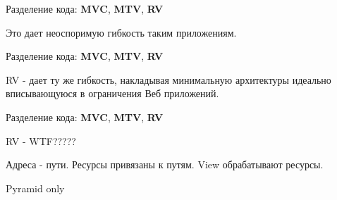 \begin{frame}{Разделение кода: \textbf{MVC}, \textbf{MTV}, \textbf{RV}}

  Это дает неоспоримую гибкость таким приложениям.

\end{frame}


\begin{frame}{Разделение кода: \textbf{MVC}, \textbf{MTV}, \textbf{RV}}

  RV - дает ту же гибкость, накладывая минимальную архитектуры идеально
  вписывающуюся в ограничения Веб приложений.

\end{frame}


\begin{frame}{Разделение кода: \textbf{MVC}, \textbf{MTV}, \textbf{RV}}

  RV - WTF?????

  Адреса - пути.
  Ресурсы привязаны к путям.
  View обрабатывают ресурсы.

  Pyramid only

\end{frame}




